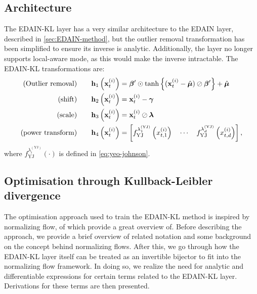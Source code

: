 \documentclass{statsmsc}
\begin{document}
{\subsection{Architecture}%
\label{sub:Architecture}

The \ac{EDAIN-KL} layer has a very similar architecture to the \ac{EDAIN} layer, described in
\cref{sec:EDAIN-method}, but the outlier removal transformation has been simplified to ensure its
inverse is analytic. Additionally, the layer no longer supports local-aware mode, as this
would make the inverse intractable. The \ac{EDAIN-KL} transformations are:
\begin{align}
    \textrm{(Outlier removal)} \qquad& \mathbf{h}_1\left(\mathbf{x}^{(i)}_t\right)=\bm\beta' \odot \tanh\left\{(\mathbf{x}^{(i)}_t - \hat{\bm\mu}) \oslash \bm\beta' \right\}+\hat{\bm\mu} \label{eq:kl1}\\
    \textrm{(shift)} \qquad& \mathbf{h}_2\left(\mathbf{x}^{(i)}_t\right)=\mathbf{x}^{(i)}_t- \bm\gamma \label{eq:kl2}\\
    \textrm{(scale)} \qquad& \mathbf{h}_3\left(\mathbf{x}^{(i)}_t\right)=\mathbf{x}^{(i)}_t \oslash \bm\lambda  \label{eq:kl3}\\
    \textrm{(power transform)} \qquad& \mathbf{h}_4\left(\mathbf{x}^{(i)}_t\right)=\left[
        f^{\lambda_1^ {(\textrm{YJ})} }_{\textrm{YJ}}\left(x^{(i)}_{t,1}\right)
        \quad \cdots
        \quad f^{\lambda_d^ {(\textrm{YJ})}}_{\textrm{YJ}}\left(x^{(i)}_{t,d}\right)
    \right], \label{eq:kl4}
\end{align}
where $f^{\lambda_i^ {(\textrm{YJ})}}_{\textrm{YJ}}(\cdot)$ is defined in \cref{eq:yeo-johnson}.

\subsection{Optimisation through Kullback-Leibler divergence}%
\label{sub:Optimisation through Kullback-Leibler divergence}

The  optimisation approach used to train the \ac{EDAIN-KL} method is inspired by normalizing flow,
of which \cite{normalizing_flows} provide a great overview of.
Before describing the approach, we provide a brief overview of related notation and some
background on the concept behind normalizing flows. After this, we go through how the
\ac{EDAIN-KL} layer itself can be treated as an invertible bijector to fit into the
normalizing flow framework. In doing so, we realize the need for analytic and differentiable
expressions for certain terms related to the \ac{EDAIN-KL} layer. Derivations for these terms are
then presented.

}
\end{document}
